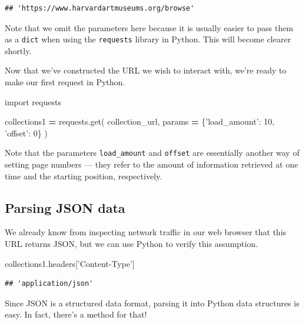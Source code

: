 \documentclass[]{book}
\newenvironment{Shaded}{\begin{snugshade}}{\end{snugshade}}
\newcommand{\DecValTok}[1]{\textcolor[rgb]{0.00,0.00,0.81}{#1}}
\newcommand{\ImportTok}[1]{#1}
\newcommand{\NormalTok}[1]{#1}
\newcommand{\OperatorTok}[1]{\textcolor[rgb]{0.81,0.36,0.00}{\textbf{#1}}}
\newcommand{\StringTok}[1]{\textcolor[rgb]{0.31,0.60,0.02}{#1}}
\begin{document}
\begin{verbatim}
## 'https://www.harvardartmuseums.org/browse'
\end{verbatim}

Note that we omit the parameters here because it is usually easier to pass them as a \texttt{dict} when using the \texttt{requests} library in Python. This will become clearer shortly.

Now that we've constructed the URL we wish to interact with, we're ready to make our first request in Python.

\begin{Shaded}
\begin{Highlighting}[]
\ImportTok{import}\NormalTok{ requests}

\NormalTok{collections1 }\OperatorTok{=}\NormalTok{ requests.get(}
\NormalTok{    collection_url,}
\NormalTok{    params }\OperatorTok{=}\NormalTok{ \{}\StringTok{'load_amount'}\NormalTok{: }\DecValTok{10}\NormalTok{,}
                  \StringTok{'offset'}\NormalTok{: }\DecValTok{0}\NormalTok{\}}
\NormalTok{)}
\end{Highlighting}
\end{Shaded}

Note that the parameters \texttt{load\_amount} and \texttt{offset} are essentially another way of setting page numbers --- they refer to the amount of information retrieved at one time and the starting position, respectively.

\hypertarget{parsing-json-data}{%
\subsection{Parsing JSON data}\label{parsing-json-data}}

We already know from inspecting network traffic in our web browser that this URL returns JSON, but we can use Python to verify this assumption.

\begin{Shaded}
\begin{Highlighting}[]
\NormalTok{collections1.headers[}\StringTok{'Content-Type'}\NormalTok{]}
\end{Highlighting}
\end{Shaded}

\begin{verbatim}
## 'application/json'
\end{verbatim}

Since JSON is a structured data format, parsing it into Python data structures is easy. In fact, there's a method for that!
\end{document}

